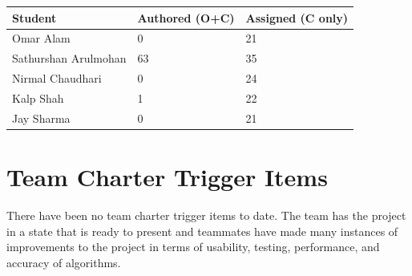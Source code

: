 \documentclass{article}
\begin{document}
\begin{table}[H]
\centering
\begin{tabular}{lll}
\toprule
\textbf{Student} & \textbf{Authored (O+C)} & \textbf{Assigned (C only)}\\
\midrule
Omar Alam & 0 & 21 \\
Sathurshan Arulmohan & 63 & 35 \\
Nirmal Chaudhari & 0 & 24 \\
Kalp Shah & 1 & 22 \\
Jay Sharma & 0 & 21 \\
\bottomrule
\end{tabular}
\end{table}

\section{Team Charter Trigger Items}

There have been no team charter trigger items to date. The team has the project
in a state that is ready to present and teammates have made many instances of 
improvements to the project in terms of usability, testing, performance, and
accuracy of algorithms.

\newpage


\end{document}
